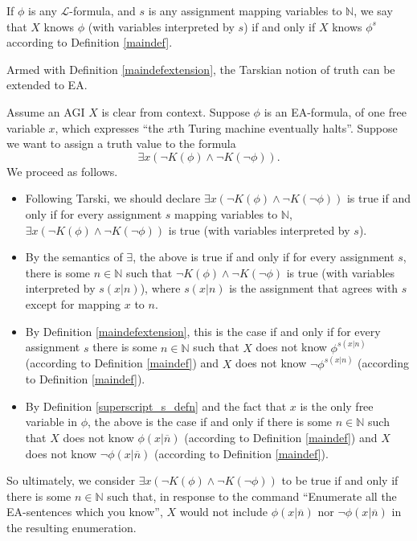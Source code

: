 \documentclass[runningheads]{llncs}
\begin{document}
\begin{definition}
\label{maindefextension}
  If $\phi$ is any $\mathscr L$-formula,
  and $s$ is any assignment mapping variables to $\mathbb N$,
  we say that $X$ knows $\phi$ (with variables interpreted by $s$) if and only if
  $X$ knows $\phi^s$ according to Definition \ref{maindef}.
\end{definition}

Armed with Definition \ref{maindefextension}, the Tarskian notion
\cite{sep-tarski-truth} of
truth can be extended to EA.

\begin{example}
  Assume an AGI $X$ is clear from context.
  Suppose $\phi$ is an EA-formula, of one free variable $x$,
  which expresses ``the $x$th Turing machine eventually halts''. Suppose we want to
  assign a truth value to the formula
  \[
  \exists x (\neg K(\phi)\wedge \neg K(\neg\phi)).
  \]
  We proceed as follows.
  \begin{itemize}
  \item Following Tarski, we should declare $\exists x (\neg K(\phi)\wedge\neg K(\neg\phi))$
  is true if and only if for every assignment $s$ mapping variables to $\mathbb N$,
  $\exists x (\neg K(\phi)\wedge\neg K(\neg\phi))$ is true (with variables interpreted
  by $s$).
  \item
  By the semantics of $\exists$, the above is true if and only if
  for every assignment $s$, there is some $n\in\mathbb N$ such that
  $\neg K(\phi)\wedge\neg K(\neg\phi)$ is true (with variables interpreted by $s(x|n)$),
  where $s(x|n)$ is the assignment that agrees with $s$ except for mapping $x$ to $n$.
  \item
  By Definition \ref{maindefextension}, this is the case if and only if
  for every assignment $s$ there is
  some $n\in\mathbb N$ such that
  $X$ does not know $\phi^{s(x|n)}$ (according to Definition \ref{maindef})
  and $X$ does not know $\neg\phi^{s(x|n)}$ (according to Definition \ref{maindef}).
  \item
  By Definition \ref{superscript_s_defn} and the fact that $x$ is the only free
  variable in $\phi$, the above is the case if and only if there
  is some $n\in\mathbb N$ such that
  $X$ does not know $\phi(x|\overline n)$ (according to Definition \ref{maindef})
  and $X$ does not know $\neg\phi(x|\overline n)$ (according to Definition \ref{maindef}).
  \end{itemize}
  So ultimately, we consider $\exists x (\neg K(\phi)\wedge \neg K(\neg\phi))$
  to be true if and only if there is some $n\in \mathbb N$ such that,
  in response to the command
  ``Enumerate all the EA-sentences which you know'',
  $X$ would not include $\phi(x|\overline n)$ nor $\neg\phi(x|\overline n)$
  in the resulting enumeration.
\end{example}
\end{document}

